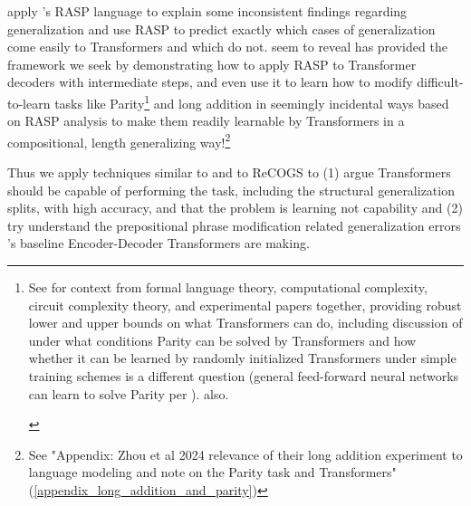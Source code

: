 \documentclass[11pt]{article}
\begin{document}
\cite{Zhou2024} apply \cite{Weiss2021}'s RASP language to explain some inconsistent findings regarding generalization and use RASP to predict exactly which cases of generalization come easily to Transformers and which do not. \cite{Zhou2024} seem to reveal \cite{Weiss2021} has provided the framework we seek by demonstrating how to apply RASP to Transformer decoders with intermediate steps, and even use it to learn how to modify difficult-to-learn tasks like Parity\footnote{\begin{footnotesize}See \cite{Strobl2024} for context from formal language theory, computational complexity, circuit complexity theory, and experimental papers together, providing robust lower and upper bounds on what Transformers can do, including discussion of under what conditions Parity can be solved by Transformers and how whether it can be learned by randomly initialized Transformers under simple training schemes is a different question (general feed-forward neural networks can learn to solve Parity per \cite{10.7551/mitpress/4943.003.0128}). \cite{delétang2023neuralnetworkschomskyhierarchy} also.
\end{footnotesize}} and long addition in seemingly incidental ways based on RASP analysis to make them readily learnable by Transformers in a compositional, length generalizing way!\footnote{See "Appendix: Zhou et al 2024 relevance of their long addition experiment to language modeling and note on the Parity task and Transformers" (\ref{appendix_long_addition_and_parity})}

Thus we apply techniques similar to \cite{Zhou2024} and \cite{Weiss2021} to ReCOGS to (1) argue Transformers should be capable of performing the task, including the structural generalization splits, with high accuracy, and that the problem is learning not capability and (2) try understand the prepositional phrase modification related generalization errors \cite{Wu2023}'s baseline Encoder-Decoder Transformers are making.
\end{document}
